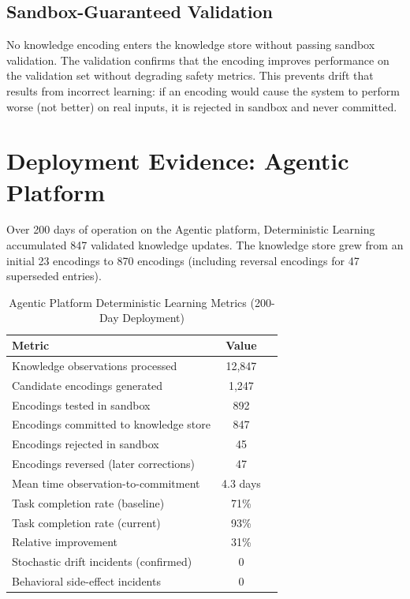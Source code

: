 \documentclass[12pt]{article}
\begin{document}
\subsection{Sandbox-Guaranteed Validation}

No knowledge encoding enters the knowledge store without passing sandbox validation. The validation confirms that the encoding improves performance on the validation set without degrading safety metrics. This prevents drift that results from incorrect learning: if an encoding would cause the system to perform worse (not better) on real inputs, it is rejected in sandbox and never committed.

\section{Deployment Evidence: Agentic Platform}
\label{sec:deployment}

Over 200 days of operation on the Agentic platform, Deterministic Learning accumulated 847 validated knowledge updates. The knowledge store grew from an initial 23 encodings to 870 encodings (including reversal encodings for 47 superseded entries).

\begin{center}
\begin{table}[htbp]
\caption{Agentic Platform Deterministic Learning Metrics (200-Day Deployment)}
\label{tab:learning-metrics}
\begin{tabular}{lcc}
\toprule
\textbf{Metric} & \textbf{Value} \\
\midrule
Knowledge observations processed & 12,847 \\
Candidate encodings generated & 1,247 \\
Encodings tested in sandbox & 892 \\
Encodings committed to knowledge store & 847 \\
Encodings rejected in sandbox & 45 \\
Encodings reversed (later corrections) & 47 \\
Mean time observation-to-commitment & 4.3 days \\
Task completion rate (baseline) & 71\% \\
Task completion rate (current) & 93\% \\
Relative improvement & 31\% \\
Stochastic drift incidents (confirmed) & 0 \\
Behavioral side-effect incidents & 0 \\
\bottomrule
\end{tabular}
\end{table}
\end{center}
\end{document}

